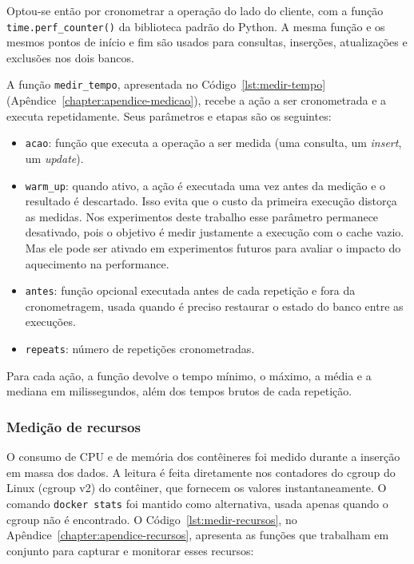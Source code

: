 Optou-se então por cronometrar a operação do lado do cliente, com a função
\texttt{time.perf\_counter()} da biblioteca padrão do Python. 
A mesma função e os mesmos pontos de início e fim
são usados para consultas, inserções, atualizações e exclusões nos dois
bancos. 

A função \texttt{medir\_tempo}, apresentada no
Código~\ref{lst:medir-tempo} (Apêndice~\ref{chapter:apendice-medicao}), recebe a ação a ser cronometrada e a executa
repetidamente. Seus parâmetros e etapas são os seguintes:

\begin{itemize}
  \item \texttt{acao}: função que executa a operação a ser
  medida (uma consulta, um \textit{insert}, um \textit{update}).
  \item \texttt{warm\_up}: quando ativo, a ação é executada uma vez antes da
  medição e o resultado é descartado. Isso evita que o custo da primeira
  execução distorça as medidas. Nos experimentos deste trabalho esse parâmetro permanece desativado,
  pois o objetivo é medir justamente a execução com o cache vazio. Mas ele pode ser ativado
  em experimentos futuros para avaliar o impacto do aquecimento na performance.
  \item \texttt{antes}: função opcional executada antes de cada repetição e
  fora da cronometragem, usada quando é preciso restaurar o estado do banco
  entre as execuções.
  \item \texttt{repeats}: número de repetições cronometradas.
\end{itemize}

Para cada ação, a função devolve o tempo mínimo, o máximo, a média e a mediana
em milissegundos, além dos tempos brutos de cada repetição. 

\subsubsection{Medição de recursos}
\label{subsec:medicao-recursos}

O consumo de CPU e de memória dos contêineres foi medido durante a inserção em massa dos dados. A leitura é feita diretamente nos contadores do cgroup do Linux (cgroup v2) do contêiner, que fornecem os valores instantaneamente. O comando \texttt{docker stats} foi mantido como alternativa, usada apenas quando o cgroup não é encontrado. 
O Código~\ref{lst:medir-recursos}, no Apêndice~\ref{chapter:apendice-recursos}, apresenta as funções que trabalham em conjunto para capturar e monitorar esses recursos:

